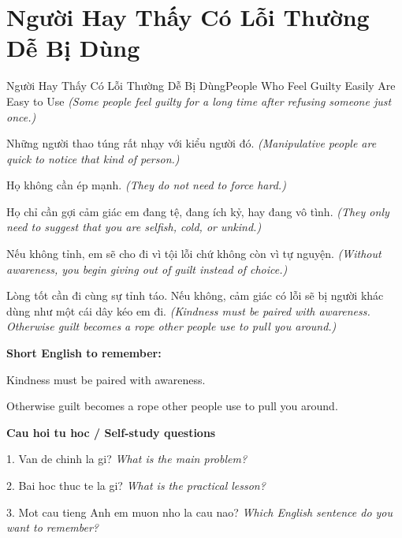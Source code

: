 \section{Người Hay Thấy Có Lỗi Thường Dễ Bị Dùng}
\begin{truyen}{Người Hay Thấy Có Lỗi Thường Dễ Bị Dùng}{People Who Feel Guilty Easily Are Easy to Use}
\textit{(Some people feel guilty for a long time after refusing someone just once.)}

Những người thao túng rất nhạy với kiểu người đó.
\textit{(Manipulative people are quick to notice that kind of person.)}

Họ không cần ép mạnh.
\textit{(They do not need to force hard.)}

Họ chỉ cần gợi cảm giác em đang tệ, đang ích kỷ, hay đang vô tình.
\textit{(They only need to suggest that you are selfish, cold, or unkind.)}

Nếu không tỉnh, em sẽ cho đi vì tội lỗi chứ không còn vì tự nguyện.
\textit{(Without awareness, you begin giving out of guilt instead of choice.)}

\end{truyen}

\begin{baihoc}
Lòng tốt cần đi cùng sự tỉnh táo. Nếu không, cảm giác có lỗi sẽ bị người khác dùng như một cái dây kéo em đi.
\textit{(Kindness must be paired with awareness. Otherwise guilt becomes a rope other people use to pull you around.)}
\end{baihoc}

\begin{ghinhoanh}
\textbf{Short English to remember:}

Kindness must be paired with awareness.

Otherwise guilt becomes a rope other people use to pull you around.

\end{ghinhoanh}

\begin{tuhocnhanh}
\textbf{Cau hoi tu hoc / Self-study questions}

1. Van de chinh la gi? \textit{What is the main problem?}

2. Bai hoc thuc te la gi? \textit{What is the practical lesson?}

3. Mot cau tieng Anh em muon nho la cau nao? \textit{Which English sentence do you want to remember?}
\end{tuhocnhanh}
\ngancach

